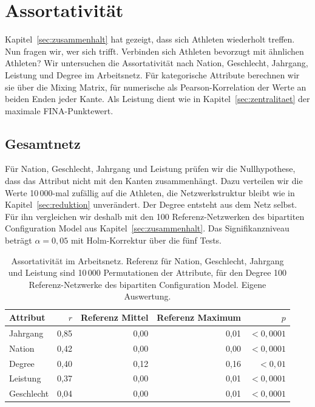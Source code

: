 \section{Assortativität}
\label{sec:assortativitaet}

Kapitel~\ref{sec:zusammenhalt} hat gezeigt, dass sich Athleten wiederholt
treffen. Nun fragen wir, wer sich trifft. Verbinden sich Athleten bevorzugt
mit ähnlichen Athleten? Wir untersuchen die Assortativität nach Nation,
Geschlecht, Jahrgang, Leistung und Degree im Arbeitsnetz. Für kategorische
Attribute berechnen wir sie über die Mixing Matrix, für numerische als
Pearson-Korrelation der Werte an beiden Enden jeder Kante. Als Leistung
dient wie in Kapitel~\ref{sec:zentralitaet} der maximale FINA-Punktewert.

\subsection{Gesamtnetz}
Für Nation, Geschlecht, Jahrgang und Leistung prüfen wir die
Nullhypothese, dass das Attribut nicht mit den Kanten zusammenhängt. Dazu
verteilen wir die Werte 10\,000-mal zufällig auf die Athleten, die
Netzwerkstruktur bleibt wie in Kapitel~\ref{sec:reduktion} unverändert. Der
Degree entsteht aus dem Netz selbst. Für ihn vergleichen wir deshalb mit
den 100 Referenz-Netzwerken des bipartiten Configuration Model aus
Kapitel~\ref{sec:zusammenhalt}. Das Signifikanzniveau beträgt
$\alpha = 0{,}05$ mit Holm-Korrektur über die fünf Tests.

\begin{table}[H]
  \centering
  \caption{Assortativität im Arbeitsnetz. Referenz für Nation, Geschlecht,
  Jahrgang und Leistung sind 10\,000 Permutationen der Attribute, für den
  Degree 100 Referenz-Netzwerke des bipartiten Configuration Model. Eigene
  Auswertung.}
  \label{tab:assortativitaet}
  \begin{tabular}{@{}lrrrr@{}}
    \toprule
    Attribut & $r$ & Referenz Mittel & Referenz Maximum & $p$ \\
    \midrule
    Jahrgang & 0,85 & 0,00 & 0,01 & $< 0{,}0001$ \\
    Nation & 0,42 & 0,00 & 0,00 & $< 0{,}0001$ \\
    Degree & 0,40 & 0,12 & 0,16 & $< 0{,}01$ \\
    Leistung & 0,37 & 0,00 & 0,01 & $< 0{,}0001$ \\
    Geschlecht & 0,04 & 0,00 & 0,01 & $< 0{,}0001$ \\
    \bottomrule
  \end{tabular}
\end{table}

